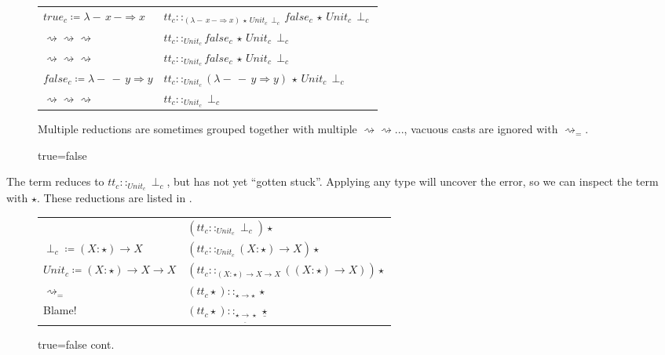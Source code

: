 \begin{sidewaysfigure}
\begin{tabular}{ll}
$true_{c}\coloneqq\lambda-\,x\,-\Rightarrow x$ & $tt_{c}::_{\left(\lambda-\,x\,-\Rightarrow x\right)\,\star\,Unit_{c}\,\perp_{c}}false_{c}\,\star\,Unit_{c}\,\perp_{c}$\tabularnewline

$\rightsquigarrow\rightsquigarrow\rightsquigarrow$ & $tt_{c}::_{Unit_{c}}false_{c}\,\star\,Unit_{c}\,\perp_{c}$\tabularnewline

$\rightsquigarrow\rightsquigarrow\rightsquigarrow$ & $tt_{c}::_{Unit_{c}}false_{c}\,\star\,Unit_{c}\,\perp_{c}$\tabularnewline

$false_{c}\coloneqq\lambda-\,-\,y\Rightarrow y$ & $tt_{c}::_{Unit_{c}}\left(\lambda-\,-\,y \Rightarrow y\right)\,\star\,Unit_{c}\,\perp_{c}$\tabularnewline

$\rightsquigarrow\rightsquigarrow\rightsquigarrow$ & $tt_{c}::_{Unit_{c}}\perp_{c}$\tabularnewline
\end{tabular}
Multiple reductions are sometimes grouped together with multiple $\rightsquigarrow\rightsquigarrow...$, vacuous casts are ignored with $\rightsquigarrow_{=}$.
\caption{true=false}
\label{fig:cast-ex-tf}
\end{sidewaysfigure}

The term reduces to $tt_{c}::_{Unit_{c}}\perp_{c}$, but has not yet ``gotten stuck''.
Applying  any type will uncover the error, so we can inspect the term with $\star$.
These reductions are listed in .

\begin{figure}
\begin{tabular}{ll}
& $\left(tt_{c}::_{Unit_{c}}\perp_{c}\right)\star$\tabularnewline
$\perp_{c}\coloneqq\left(X:\star\right)\rightarrow X$ & $\left( tt_{c}::_{Unit_{c}}\left(X:\star\right)\rightarrow X\right)  \star$\tabularnewline

$Unit_{c}\coloneqq\left(X:\star\right)\rightarrow X\rightarrow X$ & $\left( tt_{c}::_{\left(X:\star\right)\rightarrow X\rightarrow X}\left(\left(X:\star\right)\rightarrow X\right)\right)  \star$\tabularnewline

$\rightsquigarrow_{=}$ & $\left(tt_{c}\star\right)::_{\star\rightarrow\star}\star$\tabularnewline
Blame! & $\left(tt_{c}\star\right)::_{\star\underline{\rightarrow}\star}\underline{\star}$\tabularnewline
\end{tabular}
\caption{true=false cont.}
\label{fig:cast-ex-tf-2}
\end{figure}

